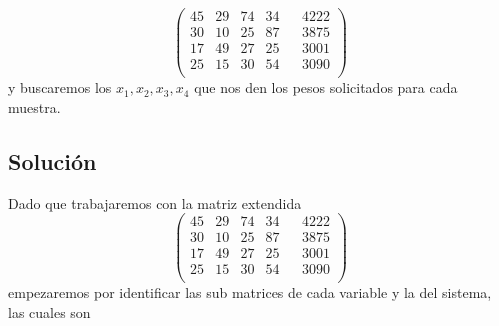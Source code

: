 \documentclass[12pt, landscape]{article}
\begin{document}
	$$\begin{pmatrix}
		45 & 29 & 74 & 34 && 4222\\
		30 & 10 & 25 & 87 && 3875\\
		17 & 49 & 27 & 25 && 3001\\
		25 & 15 & 30 & 54 && 3090\\
	\end{pmatrix}$$
	y buscaremos los $x_1, x_2, x_3, x_4$ que nos den los pesos solicitados para cada muestra.


\subsection*{Soluci\'on}
	Dado que trabajaremos con la matriz extendida
		$$\begin{pmatrix}
			45 & 29 & 74 & 34 && 4222\\
			30 & 10 & 25 & 87 && 3875\\
			17 & 49 & 27 & 25 && 3001\\
			25 & 15 & 30 & 54 && 3090\\
		\end{pmatrix}$$
	empezaremos por identificar las sub matrices de cada variable y la del sistema, las cuales son
\end{document}
